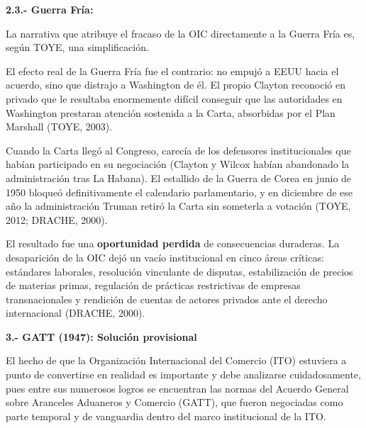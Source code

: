 \documentclass[10pt,a4paper]{article}
\begin{document}
\textbf{2.3.- Guerra Fría: }

La narrativa que atribuye el fracaso de la OIC directamente a la Guerra Fría es, según TOYE, una simplificación. 

El efecto real de la Guerra  Fría fue el contrario: no empujó a EEUU hacia el acuerdo, sino que distrajo a Washington de él. El propio Clayton reconoció en privado que le resultaba enormemente difícil conseguir que las autoridades en Washington prestaran atención sostenida a la Carta, absorbidas por el Plan Marshall (TOYE, 2003).

Cuando la Carta llegó al Congreso, carecía de los defensores institucionales  que habían participado en su negociación (Clayton y Wilcox habían abandonado  la administración tras La Habana). El estallido de la Guerra de Corea en junio  de 1950 bloqueó definitivamente el calendario parlamentario, y en diciembre de  ese año la administración Truman retiró la Carta sin someterla a votación (TOYE, 2012; DRACHE, 2000). 

El resultado fue una \textbf{oportunidad perdida} de consecuencias duraderas. La desaparición de la OIC dejó un vacío institucional en cinco áreas críticas: estándares laborales, resolución vinculante de disputas, estabilización de precios  de materias primas, regulación de prácticas restrictivas de empresas  transnacionales y rendición de cuentas de actores privados ante el derecho internacional (DRACHE, 2000).


\textbf{3.- GATT (1947): Solución provisional}

El hecho de que la Organización Internacional del Comercio (ITO) estuviera a punto de convertirse en realidad es importante y debe analizarse cuidadosamente, pues entre sus numerosos logros se encuentran las normas del Acuerdo General sobre Aranceles Aduaneros y Comercio (GATT), que fueron negociadas como parte temporal y de vanguardia dentro del marco institucional de la ITO. 
\end{document}
